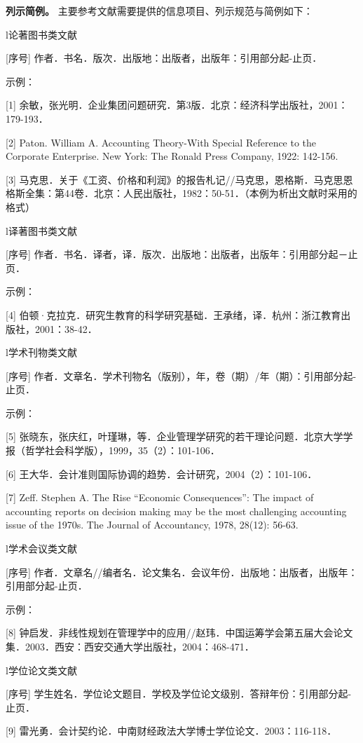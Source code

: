 \documentclass[doublesided]{Style/ucasthesis}%
\begin{document}
\textbf{列示简例。} 主要参考文献需要提供的信息项目、列示规范与简例如下：

l论著图书类文献

{[}序号{]} 作者．书名．版次．出版地：出版者，出版年：引用部分起-止页．

示例：

{[}1{]} 余敏，张光明．企业集团问题研究．第3版．北京：经济科学出版社，2001：179-193．

{[}2{]} Paton. William A. Accounting Theory-With Special Reference to the Corporate Enterprise. New York: The Ronald Press Company, 1922: 142-156.

{[}3{]} 马克思．关于《工资、价格和利润》的报告札记//马克思，恩格斯．马克思恩格斯全集：第44卷．北京：人民出版社，1982：50-51．（本例为析出文献时采用的格式）

l译著图书类文献

{[}序号{]} 作者．书名．译者，译．版次．出版地：出版者，出版年：引用部分起－止页．

示例：

{[}4{]} 伯顿·克拉克．研究生教育的科学研究基础．王承绪，译．杭州：浙江教育出版社，2001：38-42．

l学术刊物类文献

{[}序号{]} 作者．文章名．学术刊物名（版别），年，卷（期）/年（期）：引用部分起-止页．

示例：

{[}5{]} 张晓东，张庆红，叶瑾琳，等．企业管理学研究的若干理论问题．北京大学学报（哲学社会科学版），1999，35（2）：101-106．

{[}6{]} 王大华．会计准则国际协调的趋势．会计研究，2004（2）：101-106．

{[}7{]} Zeff. Stephen A. The Rise ``Economic Consequences'': The impact of accounting reports on decision making may be the most challenging accounting issue of the 1970s. The Journal of Accountancy, 1978, 28(12): 56-63.

l学术会议类文献

{[}序号{]} 作者．文章名//编者名．论文集名．会议年份．出版地：出版者，出版年：引用部分起-止页．

示例：

{[}8{]} 钟启发．非线性规划在管理学中的应用//赵玮．中国运筹学会第五届大会论文集．2003．西安：西安交通大学出版社，2004：468-471．

l学位论文类文献

{[}序号{]} 学生姓名．学位论文题目．学校及学位论文级别．答辩年份：引用部分起-止页．

{[}9{]} 雷光勇．会计契约论．中南财经政法大学博士学位论文．2003：116-118．
\end{document}
